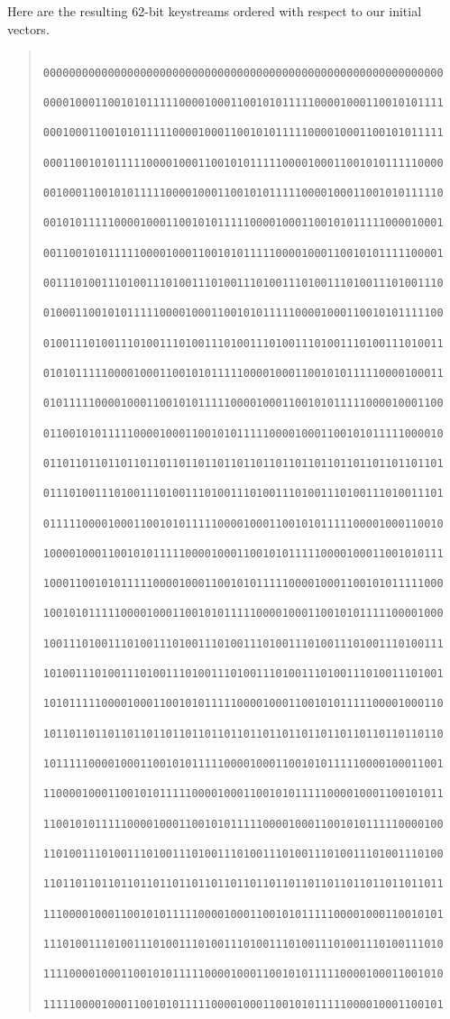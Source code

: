 \documentclass[10pt,letterpaper]{report}
\begin{document}
\begin{enumerate}
	Here are the resulting 62-bit keystreams ordered with respect to our initial vectors.
	\begin{quote}
	\begin{verbatim}
	00000000000000000000000000000000000000000000000000000000000000
	00001000110010101111100001000110010101111100001000110010101111
	00010001100101011111000010001100101011111000010001100101011111
	00011001010111110000100011001010111110000100011001010111110000
	00100011001010111110000100011001010111110000100011001010111110
	00101011111000010001100101011111000010001100101011111000010001
	00110010101111100001000110010101111100001000110010101111100001
	00111010011101001110100111010011101001110100111010011101001110
	01000110010101111100001000110010101111100001000110010101111100
	01001110100111010011101001110100111010011101001110100111010011
	01010111110000100011001010111110000100011001010111110000100011
	01011111000010001100101011111000010001100101011111000010001100
	01100101011111000010001100101011111000010001100101011111000010
	01101101101101101101101101101101101101101101101101101101101101
	01110100111010011101001110100111010011101001110100111010011101
	01111100001000110010101111100001000110010101111100001000110010
	10000100011001010111110000100011001010111110000100011001010111
	10001100101011111000010001100101011111000010001100101011111000
	10010101111100001000110010101111100001000110010101111100001000
	10011101001110100111010011101001110100111010011101001110100111
	10100111010011101001110100111010011101001110100111010011101001
	10101111100001000110010101111100001000110010101111100001000110
	10110110110110110110110110110110110110110110110110110110110110
	10111110000100011001010111110000100011001010111110000100011001
	11000010001100101011111000010001100101011111000010001100101011
	11001010111110000100011001010111110000100011001010111110000100
	11010011101001110100111010011101001110100111010011101001110100
	11011011011011011011011011011011011011011011011011011011011011
	11100001000110010101111100001000110010101111100001000110010101
	11101001110100111010011101001110100111010011101001110100111010
	11110000100011001010111110000100011001010111110000100011001010
	11111000010001100101011111000010001100101011111000010001100101
	\end{verbatim}
	\end{quote}
	

\end{enumerate}
\end{document}
